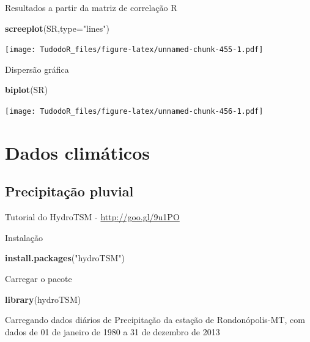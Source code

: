 \documentclass[
]{book}
\newenvironment{Shaded}{\begin{snugshade}}{\end{snugshade}}
\newcommand{\DataTypeTok}[1]{\textcolor[rgb]{0.13,0.29,0.53}{#1}}
\newcommand{\KeywordTok}[1]{\textcolor[rgb]{0.13,0.29,0.53}{\textbf{#1}}}
\newcommand{\NormalTok}[1]{#1}
\newcommand{\StringTok}[1]{\textcolor[rgb]{0.31,0.60,0.02}{#1}}
\begin{document}
Resultados a partir da matriz de correlação R

\begin{Shaded}
\begin{Highlighting}[]
\KeywordTok{screeplot}\NormalTok{(SR,}\DataTypeTok{type=}\StringTok{"lines"}\NormalTok{)}
\end{Highlighting}
\end{Shaded}

\texttt{[image: TudodoR\_files/figure-latex/unnamed-chunk-455-1.pdf]}

Dispersão gráfica

\begin{Shaded}
\begin{Highlighting}[]
\KeywordTok{biplot}\NormalTok{(SR)}
\end{Highlighting}
\end{Shaded}

\texttt{[image: TudodoR\_files/figure-latex/unnamed-chunk-456-1.pdf]}

\hypertarget{dados-climuxe1ticos-1}{%
\chapter{Dados climáticos}\label{dados-climuxe1ticos-1}}

\hypertarget{precipitauxe7uxe3o-pluvial}{%
\section{Precipitação pluvial}\label{precipitauxe7uxe3o-pluvial}}

Tutorial do HydroTSM - \url{http://goo.gl/9u1PO}

Instalação

\begin{Shaded}
\begin{Highlighting}[]
\KeywordTok{install.packages}\NormalTok{(}\StringTok{"hydroTSM"}\NormalTok{)}
\end{Highlighting}
\end{Shaded}

Carregar o pacote

\begin{Shaded}
\begin{Highlighting}[]
\KeywordTok{library}\NormalTok{(hydroTSM)}
\end{Highlighting}
\end{Shaded}

Carregando dados diários de Precipitação da estação de Rondonópolis-MT, com dados de 01 de janeiro de 1980 a 31 de dezembro de 2013
\end{document}
